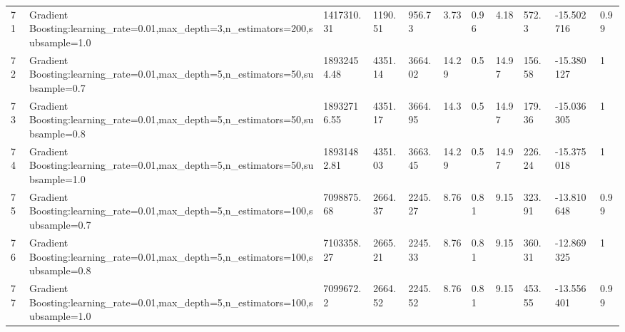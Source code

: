 \begin{longtable}{C{0.8cm} L{2cm} C{1.15cm} C{1.15cm} C{1.15cm} C{1.15cm} C{0.85cm} C{1.25cm} C{1.2cm} C{1.5cm} C{1.0cm}}
71 & Gradient Boosting:\newline learning\_rate=0.01,\newline max\_depth=3,\newline n\_estimators=200,\newline subsample=1.0 & 1417310.31 & 1190.51 & 956.73 & 3.73 & 0.96 & 4.18 & 572.3 & -15.502716 & 0.99 \\
72 & Gradient Boosting:\newline learning\_rate=0.01,\newline max\_depth=5,\newline n\_estimators=50,\newline subsample=0.7 & 18932454.48 & 4351.14 & 3664.02 & 14.29 & 0.5 & 14.97 & 156.58 & -15.380127 & 1 \\
73 & Gradient Boosting:\newline learning\_rate=0.01,\newline max\_depth=5,\newline n\_estimators=50,\newline subsample=0.8 & 18932716.55 & 4351.17 & 3664.95 & 14.3 & 0.5 & 14.97 & 179.36 & -15.036305 & 1 \\
74 & Gradient Boosting:\newline learning\_rate=0.01,\newline max\_depth=5,\newline n\_estimators=50,\newline subsample=1.0 & 18931482.81 & 4351.03 & 3663.45 & 14.29 & 0.5 & 14.97 & 226.24 & -15.375018 & 1 \\
75 & Gradient Boosting:\newline learning\_rate=0.01,\newline max\_depth=5,\newline n\_estimators=100,\newline subsample=0.7 & 7098875.68 & 2664.37 & 2245.27 & 8.76 & 0.81 & 9.15 & 323.91 & -13.810648 & 0.99 \\
76 & Gradient Boosting:\newline learning\_rate=0.01,\newline max\_depth=5,\newline n\_estimators=100,\newline subsample=0.8 & 7103358.27 & 2665.21 & 2245.33 & 8.76 & 0.81 & 9.15 & 360.31 & -12.869325 & 1 \\
77 & Gradient Boosting:\newline learning\_rate=0.01,\newline max\_depth=5,\newline n\_estimators=100,\newline subsample=1.0 & 7099672.2 & 2664.52 & 2245.52 & 8.76 & 0.81 & 9.15 & 453.55 & -13.556401 & 0.99 \\

\end{longtable}
